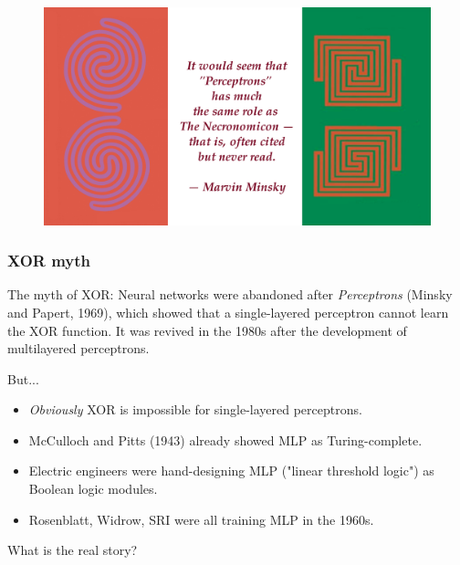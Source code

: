 \documentclass{beamer}
\begin{document}
\begin{frame}
    
    \begin{figure}[t]
        \centerline{\includegraphics[width=1.3\textwidth]{figure/necronomicon_quote.png}}
    \end{figure}
\end{frame}
\begin{frame}
    \frametitle{XOR myth}
    The myth of XOR: Neural networks were abandoned after \textit{Perceptrons} (Minsky and Papert, 1969), which showed that a single-layered perceptron cannot learn the XOR function. It was revived in the 1980s after the development of multilayered perceptrons.

    \pause But...
    \begin{itemize}
        \item \textit{Obviously} XOR is impossible for single-layered perceptrons.
        \item McCulloch and Pitts (1943) already showed MLP as Turing-complete.
        \item Electric engineers were hand-designing MLP ("linear threshold logic") as Boolean logic modules.
        \item Rosenblatt, Widrow, SRI were all training MLP in the 1960s.
    \end{itemize}

    What is the real story?
\end{frame}
\end{document}
